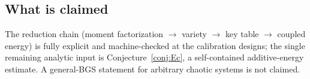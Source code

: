 \subsection{What is claimed}

The reduction chain (moment factorization $\to$ variety $\to$ key
table $\to$ coupled energy) is fully explicit and machine-checked at
the calibration designs; the single remaining analytic input is
Conjecture~\ref{conj:Ec}, a self-contained additive-energy estimate.
A general-BGS statement for arbitrary chaotic systems is not claimed.
